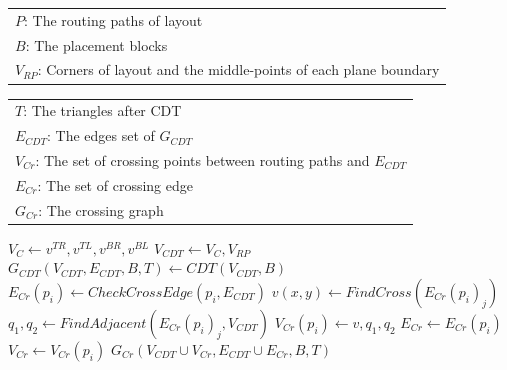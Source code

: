      \newcommand{\CCG}{\ensuremath{\mbox{\sc ConstCrossGraph}}}
      \begin{algorithm}[hbt]  
        \caption{$\CCG(P,B,V_{RP})$}\label{alg:CCG}                       
        \begin{scriptsize}
          \begin{algorithmic}[1]
            \REQUIRE 
              \begin{tabular}{l}
                $P$: The routing paths of layout\\
                $B$: The placement blocks \\
                $V_{RP}$: Corners of layout and the middle-points of each plane boundary\\ 
              \end{tabular}
            \ENSURE 
              \begin{tabular}{l}
                $T$: The triangles after CDT\\
                $E_{CDT}$: The edges set of $G_{CDT}$\\
                $V_{Cr}$: The set of crossing points between routing paths and $E_{CDT}$\\
                $E_{Cr}$: The set of crossing edge\\
                $G_{Cr}$: The crossing graph
              \end{tabular}
              \STATE $V_C \gets v^{TR},v^{TL},v^{BR},v^{BL} $ 
            \ENDFOR
            \STATE $V_{CDT}\gets V_C, V_{RP}$  \label{line:VCDT}
            \STATE $G_{CDT}(V_{CDT},E_{CDT},B,T) \gets CDT(V_{CDT},B)$   \label{line:GCDT}
             \label{line:StartCross}
              \STATE $E_{Cr}(p_i) \gets CheckCrossEdge(p_i,E_{CDT})$
                \STATE $v(x,y) \gets FindCross({E_{Cr}(p_i)}_j)$
                \STATE $q_1,q_2 \gets FindAdjacent({E_{Cr}(p_i)}_j,V_{CDT})$
                \STATE $V_{Cr}(p_i) \gets v,q_1,q_2$
              \ENDFOR
              \STATE $E_{Cr} \gets E_{Cr}(p_i)$
              \STATE $V_{Cr} \gets V_{Cr}(p_i)$
            \ENDFOR \label{line:EndCross}
            \RETURN $G_{Cr}(V_{CDT}\cup V_{Cr}, E_{CDT} \cup E_{Cr},B,T)$  
          \end{algorithmic}
        \end{scriptsize} 
      \end{algorithm}

